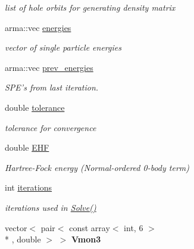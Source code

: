 \begin{DoxyCompactItemize}
\begin{DoxyCompactList}\small\item\em list of hole orbits for generating density matrix \end{DoxyCompactList}\item 
\hypertarget{classHartreeFock_a415fc1fbbba3a6a84d47e31ed18323c9}{arma\-::vec \hyperlink{classHartreeFock_a415fc1fbbba3a6a84d47e31ed18323c9}{energies}}\label{classHartreeFock_a415fc1fbbba3a6a84d47e31ed18323c9}

\begin{DoxyCompactList}\small\item\em vector of single particle energies \end{DoxyCompactList}\item 
\hypertarget{classHartreeFock_a43e2a195ad044947a9e1fb9f3a937d8a}{arma\-::vec \hyperlink{classHartreeFock_a43e2a195ad044947a9e1fb9f3a937d8a}{prev\-\_\-energies}}\label{classHartreeFock_a43e2a195ad044947a9e1fb9f3a937d8a}

\begin{DoxyCompactList}\small\item\em S\-P\-E's from last iteration. \end{DoxyCompactList}\item 
\hypertarget{classHartreeFock_a22c754579ad1a45f053a5305e87d4700}{double \hyperlink{classHartreeFock_a22c754579ad1a45f053a5305e87d4700}{tolerance}}\label{classHartreeFock_a22c754579ad1a45f053a5305e87d4700}

\begin{DoxyCompactList}\small\item\em tolerance for convergence \end{DoxyCompactList}\item 
\hypertarget{classHartreeFock_a16c9e1791919c2ceef5584bdc9b84a81}{double \hyperlink{classHartreeFock_a16c9e1791919c2ceef5584bdc9b84a81}{E\-H\-F}}\label{classHartreeFock_a16c9e1791919c2ceef5584bdc9b84a81}

\begin{DoxyCompactList}\small\item\em Hartree-\/\-Fock energy (Normal-\/ordered 0-\/body term) \end{DoxyCompactList}\item 
\hypertarget{classHartreeFock_a7658fa0b1b05dfa7bf7b8aa7e5fd6bb3}{int \hyperlink{classHartreeFock_a7658fa0b1b05dfa7bf7b8aa7e5fd6bb3}{iterations}}\label{classHartreeFock_a7658fa0b1b05dfa7bf7b8aa7e5fd6bb3}

\begin{DoxyCompactList}\small\item\em iterations used in \hyperlink{classHartreeFock_a0666507747c17845ab4f74b97414703c}{Solve()} \end{DoxyCompactList}\item 
\hypertarget{classHartreeFock_aa7e970505e9ab444d0cdb377b5f7c7b0}{vector$<$ pair$<$ const array$<$ int, 6 $>$\\*
, double $>$ $>$ {\bfseries Vmon3}}\label{classHartreeFock_aa7e970505e9ab444d0cdb377b5f7c7b0}

\end{DoxyCompactItemize}


